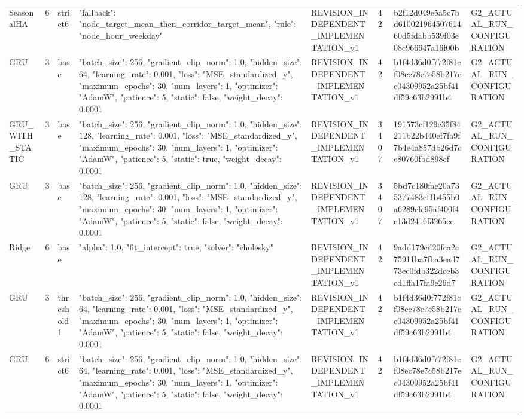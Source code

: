 \begin{longtable}{llllllll}
SeasonalHA & 6 & strict6 & {"fallback": "node\_target\_mean\_then\_corridor\_target\_mean", "rule": "node\_hour\_weekday"} & REVISION\_INDEPENDENT\_IMPLEMENTATION\_v1 & 42 & b2f12d049e5a5c7bd61002196450761460d5fdabb539f03e08c966647a16f00b & G2\_ACTUAL\_RUN\_CONFIGURATION \\
GRU & 3 & base & {"batch\_size": 256, "gradient\_clip\_norm": 1.0, "hidden\_size": 64, "learning\_rate": 0.001, "loss": "MSE\_standardized\_y", "maximum\_epochs": 30, "num\_layers": 1, "optimizer": "AdamW", "patience": 5, "static": false, "weight\_decay": 0.0001} & REVISION\_INDEPENDENT\_IMPLEMENTATION\_v1 & 42 & b1f4d36d0f772f81cf08ec78e7c58b217ec04309952a25bf41df59c63b2991b4 & G2\_ACTUAL\_RUN\_CONFIGURATION \\
GRU\_WITH\_STATIC & 3 & base & {"batch\_size": 256, "gradient\_clip\_norm": 1.0, "hidden\_size": 128, "learning\_rate": 0.001, "loss": "MSE\_standardized\_y", "maximum\_epochs": 30, "num\_layers": 1, "optimizer": "AdamW", "patience": 5, "static": true, "weight\_decay": 0.0001} & REVISION\_INDEPENDENT\_IMPLEMENTATION\_v1 & 3407 & 191573cf129c35f84211b22b440ef7fa9f7b4e4a857db26d7cc80760fbd898cf & G2\_ACTUAL\_RUN\_CONFIGURATION \\
GRU & 3 & base & {"batch\_size": 256, "gradient\_clip\_norm": 1.0, "hidden\_size": 128, "learning\_rate": 0.001, "loss": "MSE\_standardized\_y", "maximum\_epochs": 30, "num\_layers": 1, "optimizer": "AdamW", "patience": 5, "static": false, "weight\_decay": 0.0001} & REVISION\_INDEPENDENT\_IMPLEMENTATION\_v1 & 3407 & 5bd7c180fae20a735377483ef1b455b0a6289cfc95af400f4c13d2416f3265ce & G2\_ACTUAL\_RUN\_CONFIGURATION \\
Ridge & 6 & base & {"alpha": 1.0, "fit\_intercept": true, "solver": "cholesky"} & REVISION\_INDEPENDENT\_IMPLEMENTATION\_v1 & 42 & 9add179cd20fca2c75911ba7fba3ead773ec0fdb322dceb3cd1ffa17fa9e26d7 & G2\_ACTUAL\_RUN\_CONFIGURATION \\
GRU & 3 & threshold1 & {"batch\_size": 256, "gradient\_clip\_norm": 1.0, "hidden\_size": 64, "learning\_rate": 0.001, "loss": "MSE\_standardized\_y", "maximum\_epochs": 30, "num\_layers": 1, "optimizer": "AdamW", "patience": 5, "static": false, "weight\_decay": 0.0001} & REVISION\_INDEPENDENT\_IMPLEMENTATION\_v1 & 42 & b1f4d36d0f772f81cf08ec78e7c58b217ec04309952a25bf41df59c63b2991b4 & G2\_ACTUAL\_RUN\_CONFIGURATION \\
GRU & 6 & strict6 & {"batch\_size": 256, "gradient\_clip\_norm": 1.0, "hidden\_size": 64, "learning\_rate": 0.001, "loss": "MSE\_standardized\_y", "maximum\_epochs": 30, "num\_layers": 1, "optimizer": "AdamW", "patience": 5, "static": false, "weight\_decay": 0.0001} & REVISION\_INDEPENDENT\_IMPLEMENTATION\_v1 & 42 & b1f4d36d0f772f81cf08ec78e7c58b217ec04309952a25bf41df59c63b2991b4 & G2\_ACTUAL\_RUN\_CONFIGURATION \\

\end{longtable}
